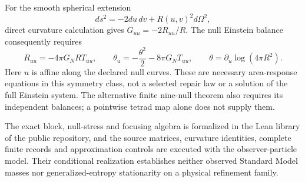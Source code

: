 For the smooth spherical extension
\[
 ds^2=-2du\,dv+R(u,v)^2d\Omega^2,
\]
direct curvature calculation gives \(G_{uu}=-2R_{uu}/R\). The null Einstein
balance consequently requires
\[
 R_{uu}=-4\pi G_NR T_{uu},\qquad
 \theta_u=-\frac{\theta^2}{2}-8\pi G_NT_{uu},\qquad
 \theta=\partial_u\log(4\pi R^2).
\]
Here \(u\) is affine along the declared null curves. These are necessary
area-response equations in this symmetry class, not a selected repair law
or a solution of the full Einstein system. The alternative finite
nine-null theorem also requires its independent balances; a pointwise
tetrad map alone does not supply them.

The exact block, null-stress and focusing algebra is formalized in the Lean
library of the public repository, and the source matrices, curvature
identities, complete finite records and approximation controls are executed
with the observer-particle model. Their conditional realization establishes
neither observed Standard Model masses nor generalized-entropy stationarity
on a physical refinement family.
